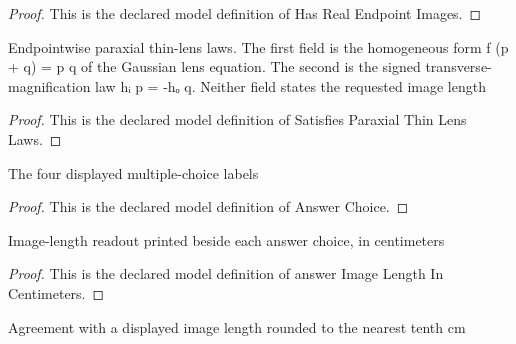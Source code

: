 \begin{proof}
  This is the declared model definition of Has Real Endpoint Images.
\end{proof}
\begin{definition}
  \label{def:physics:phyx-mini-0115:phyxminiproblems-problemphyxmini0115-satisfiesparaxialthinlenslaws}
  Endpointwise paraxial thin-lens laws. The first field is the homogeneous form f (p + q) = p q of the Gaussian lens equation. The second is the signed transverse-magnification law hᵢ p = -hₒ q. Neither field states the requested image length
\end{definition}
\begin{proof}
  This is the declared model definition of Satisfies Paraxial Thin Lens Laws.
\end{proof}
\begin{definition}
  \label{def:physics:phyx-mini-0115:phyxminiproblems-problemphyxmini0115-answerchoice}
  The four displayed multiple-choice labels
\end{definition}
\begin{proof}
  This is the declared model definition of Answer Choice.
\end{proof}
\begin{definition}
  \label{def:physics:phyx-mini-0115:phyxminiproblems-problemphyxmini0115-answerimagelengthincentimeters}
  Image-length readout printed beside each answer choice, in centimeters
\end{definition}
\begin{proof}
  This is the declared model definition of answer Image Length In Centimeters.
\end{proof}
\begin{definition}
  \label{def:physics:phyx-mini-0115:phyxminiproblems-problemphyxmini0115-roundstonearesttenthcentimeter}
  Agreement with a displayed image length rounded to the nearest tenth cm
\end{definition}
